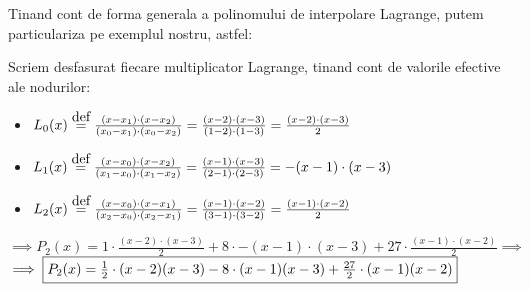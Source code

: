 \documentclass{article}
\newcommand\eqdef{\stackrel{\mathclap{\normalfont\mbox{def}}}{=}}
\begin{document}
Tinand cont de forma generala a polinomului de interpolare Lagrange, putem particulariza pe exemplul nostru, astfel:


Scriem desfasurat fiecare multiplicator Lagrange, tinand cont de valorile efective ale nodurilor:

\begin{itemize}
    \item $L_0(x) \; \eqdef \; \frac{(x-x_1) \cdot (x-x_2)}{(x_0-x_1) \cdot (x_0-x_2)} = \frac{(x-2) \cdot (x-3)}{(1-2) \cdot (1-3)} = \frac{(x-2) \cdot (x-3)}{2}$
    
    \item $L_1(x) \; \eqdef \; \frac{(x-x_0) \cdot (x-x_2)}{(x_1-x_0) \cdot (x_1-x_2)} = \frac{(x-1) \cdot (x-3)}{(2-1) \cdot (2-3)} = -(x-1) \cdot (x-3)$
    
    \item $L_2(x) \; \eqdef \; \frac{(x-x_0) \cdot (x-x_1)}{(x_2-x_0) \cdot (x_2-x_1)} = \frac{(x-1) \cdot (x-2)}{(3-1) \cdot (3-2)} = \frac{(x-1) \cdot (x-2)}{2}$
\end{itemize}

$\implies P_2(x) = 1 \cdot \frac{(x-2) \cdot (x-3)}{2} + 8 \cdot -(x-1) \cdot (x-3) + 27 \cdot \frac{(x-1) \cdot (x-2)}{2} \implies$\\

$\implies\framebox{$P_2(x) = \frac{1}{2} \cdot (x-2)(x-3) - 8 \cdot (x-1)(x-3) + \frac{27}{2} \cdot (x-1)(x-2)$}$\\
\end{document}
